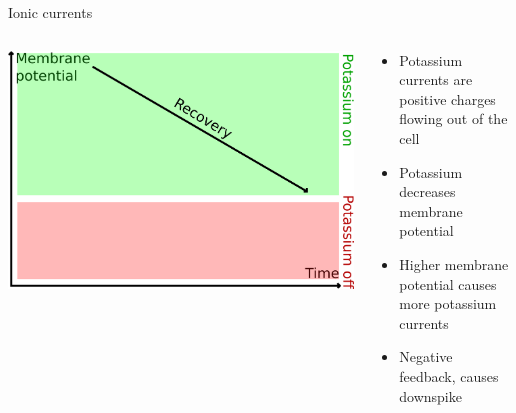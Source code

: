\documentclass[presentation]{beamer}
\begin{document}
\begin{frame}[label={sec:org9283916}]{Ionic currents}
\begin{columns}
\begin{column}{0.5\columnwidth}
\begin{center}
\includegraphics[width=.9\linewidth]{./slowpotassium.png}
\end{center}
\end{column}

\begin{column}{0.5\columnwidth}
\begin{itemize}
\item Potassium currents are positive charges flowing out of the cell
\item Potassium decreases membrane potential
\item Higher membrane potential causes more potassium currents
\item Negative feedback, causes downspike
\end{itemize}
\end{column}
\end{columns}
\end{frame}
\end{document}
